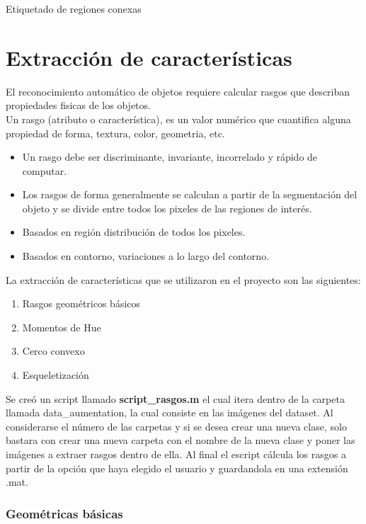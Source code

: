 \documentclass[a4paper, 11pt]{article}
\begin{document}
Etiquetado de regiones conexas\\

\section{Extracción de características}

El reconocimiento automático de objetos requiere calcular rasgos que describan propiedades fisicas de los objetos.\\

Un rasgo (atributo o característica), es un valor numérico que cuantifica alguna propiedad de forma, textura, color, geometria, etc.

\begin{itemize}
\item Un rasgo debe ser discriminante, invariante, incorrelado y rápido de computar.
\item Los rasgos de forma generalmente se calculan a partir de la segmentación del objeto y se divide entre todos los pixeles de las regiones de interés.
\item Basados en región distribución de todos los pixeles.
\item Basados en contorno, variaciones a lo largo del contorno.
\end{itemize}

La extracción de características que se utilizaron en el proyecto son las siguientes:

\begin{enumerate}
\item Rasgos geométricos básicos
\item Momentos de Hue
\item Cerco convexo 
\item Esqueletización
\end{enumerate}

Se creó un script llamado \textbf{script\_rasgos.m} el cual itera dentro de la carpeta llamada data\_aumentation, la cual consiste en las imágenes del dataset. Al considerarse el número de las carpetas y si se desea crear una nueva clase, solo bastara con crear una nueva carpeta con el nombre de la nueva clase y poner las imágenes a extraer rasgos dentro de ella. Al final el escript cálcula los rasgos a partir de la opción que haya elegido el usuario y guardandola en una extensión .mat.


\subsubsection{Geométricas básicas}
\end{document}
